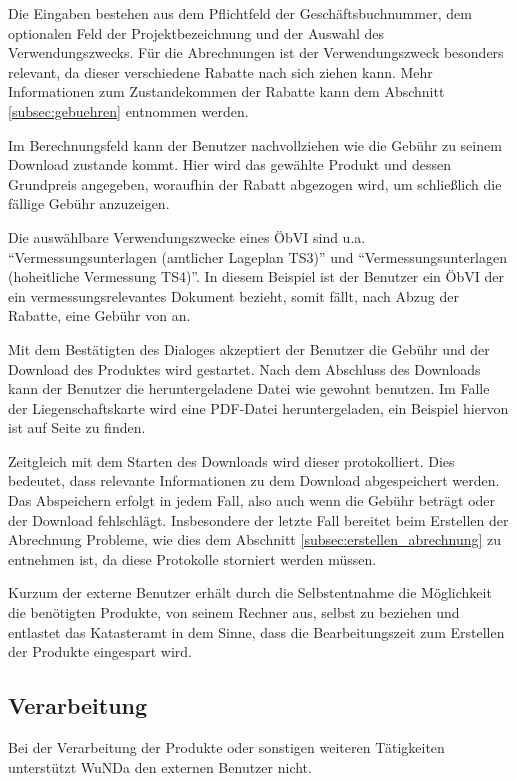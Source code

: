 Die Eingaben bestehen aus dem Pflichtfeld der Geschäftsbuchnummer, dem optionalen Feld der Projektbezeichnung und der Auswahl des Verwendungszwecks.
Für die Abrechnungen ist der Verwendungszweck besonders relevant, da dieser verschiedene Rabatte nach sich ziehen kann. Mehr Informationen zum Zustandekommen der Rabatte kann dem Abschnitt \ref{subsec:gebuehren} entnommen werden.

Im Berechnungsfeld kann der Benutzer nachvollziehen wie die Gebühr zu seinem Download zustande kommt. Hier wird das gewählte Produkt und dessen Grundpreis angegeben, woraufhin der Rabatt abgezogen wird, um schließlich die fällige Gebühr anzuzeigen.

Die auswählbare Verwendungszwecke eines \ac{ÖbVI} sind u.a. "`Vermessungsunterlagen (amtlicher Lageplan TS3)"' und "`Vermessungsunterlagen (hoheitliche Vermessung TS4)"'. In diesem Beispiel ist der Benutzer ein \ac{ÖbVI} der ein vermessungsrelevantes Dokument bezieht, somit fällt, nach Abzug der Rabatte, eine Gebühr von  an.

Mit dem Bestätigten des Dialoges akzeptiert der Benutzer die Gebühr und der Download des Produktes wird gestartet. Nach dem Abschluss des Downloads kann der Benutzer die heruntergeladene Datei wie gewohnt benutzen. Im Falle der Liegenschaftskarte wird eine PDF-Datei heruntergeladen, ein Beispiel hiervon ist auf Seite \pageref{fig:flurkarte} zu finden.

Zeitgleich mit dem Starten des Downloads wird dieser protokolliert. Dies bedeutet, dass relevante Informationen zu dem Download abgespeichert werden. Das Abspeichern erfolgt in jedem Fall, also auch wenn die Gebühr  beträgt oder der Download fehlschlägt. Insbesondere der letzte Fall bereitet beim Erstellen der Abrechnung Probleme, wie dies dem Abschnitt \vref{subsec:erstellen_abrechnung} zu entnehmen ist, da diese Protokolle storniert werden müssen.
 
Kurzum der externe Benutzer erhält durch die Selbstentnahme die Möglichkeit die benötigten Produkte, von seinem Rechner aus, selbst zu beziehen und entlastet das Katasteramt in dem Sinne, dass die Bearbeitungszeit zum Erstellen der Produkte eingespart wird.

\subsection{Verarbeitung}
Bei der Verarbeitung der Produkte oder sonstigen weiteren Tätigkeiten unterstützt \ac{WuNDa} den externen Benutzer nicht.

